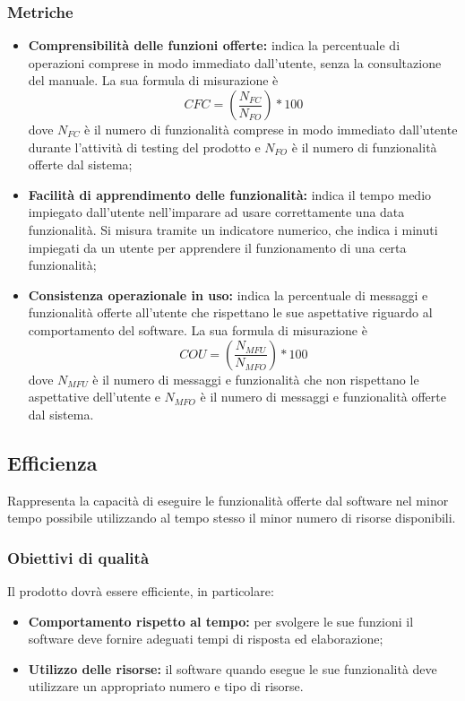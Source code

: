 \documentclass[PianoDiQualifica.tex]{subfiles}
\begin{document}
\subsubsection{Metriche}
\begin{itemize}
	\item \textbf{Comprensibilità delle funzioni offerte:} indica la percentuale di operazioni comprese in modo immediato dall'utente, senza la consultazione del manuale.  La sua formula di misurazione è \[CFC=(\frac{N_{FC}}{N_{FO}})*100\] dove $ N_{FC} $ è il numero di funzionalità comprese in modo immediato dall'utente durante l'attività di testing del prodotto e $ N_{FO} $ è il numero di funzionalità offerte dal sistema;
	\item \textbf{Facilità di apprendimento delle funzionalità:} indica il tempo medio impiegato dall'utente nell'imparare ad usare correttamente una data funzionalità. Si misura tramite un indicatore numerico, che indica i minuti impiegati da un utente per apprendere il funzionamento di una certa funzionalità;
	\item \textbf{Consistenza operazionale in uso:} indica la percentuale di messaggi e funzionalità offerte all'utente che rispettano le sue aspettative riguardo al comportamento del software.  La sua formula di misurazione è \[COU=(\frac{N_{MFU}}{N_{MFO}})*100\] dove $ N_{MFU} $ è il numero di messaggi e funzionalità che non rispettano le aspettative dell'utente e $ N_{MFO} $ è il numero di messaggi e funzionalità offerte dal sistema.	
\end{itemize}	
\subsection{Efficienza}
Rappresenta la capacità di eseguire le funzionalità offerte dal software nel minor tempo possibile utilizzando al tempo stesso il minor numero di risorse disponibili.
\subsubsection{Obiettivi di qualità}
Il prodotto dovrà essere efficiente, in particolare:
\begin{itemize}
	\item \textbf{Comportamento rispetto al tempo:} per svolgere le sue funzioni il software deve fornire adeguati tempi di risposta ed elaborazione;
	\item \textbf{Utilizzo delle risorse:} il software quando esegue le sue funzionalità deve utilizzare un appropriato numero e tipo di risorse.
\end{itemize}
\end{document}

